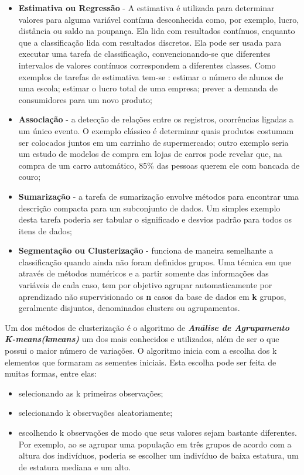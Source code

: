 \documentclass[a4paper, 12pt]{article}\usepackage[]{graphicx}\usepackage[]{color}
\begin{document}
\begin{multicols}{2}
\begin{itemize}
			\item \textbf{Estimativa ou Regressão} - A estimativa é utilizada para determinar  valores para alguma variável contínua desconhecida como, por exemplo, lucro, distância ou saldo na poupança. Ela lida com resultados contínuos, enquanto que a classificação lida com resultados discretos. Ela pode ser usada para executar uma tarefa de classificação, convencionando-se que diferentes intervalos de valores contínuos correspondem a diferentes classes. Como exemplos de tarefas de estimativa tem-se : estimar o número de alunos de uma escola; estimar o lucro  total de uma empresa;  prever a demanda de consumidores para um novo produto;
			
			\item \textbf{Associação} - a detecção de relações entre os registros, ocorrências ligadas a um único evento. O exemplo clássico é determinar quais produtos costumam ser colocados juntos em um carrinho de supermercado; outro exemplo seria um estudo de modelos de compra em lojas de carros pode revelar que, na compra de um carro automático, 85\% das pessoas querem ele com bancada de couro;
			
			\item \textbf{Sumarização} - a tarefa de sumarização envolve métodos para encontrar uma descrição compacta para um subconjunto de dados. Um simples exemplo desta tarefa poderia ser tabular o significado e desvios padrão para todos os itens de dados;
			
			\item \textbf{Segmentação ou Clusterização} - funciona de maneira semelhante a classificação quando ainda não foram definidos grupos. Uma técnica em que através de métodos numéricos e a partir somente das informações das variáveis de cada caso, tem por objetivo agrupar automaticamente por aprendizado não supervisionado os \textbf{n} casos da base de dados em \textbf{k} grupos, geralmente disjuntos, denominados clusters ou agrupamentos.			
		\end{itemize}
	
		Um dos métodos de clusterização é o algoritmo de \textit{\textbf{Análise de Agrupamento K-means(kmeans)}}  um dos mais conhecidos e utilizados, além de ser o que possui o maior número de variações. O algoritmo inicia com a escolha dos  k elementos que formaram as sementes iniciais. Esta escolha pode ser feita de muitas formas, entre elas:
		\begin{itemize}
			\item selecionando as k primeiras observações;
			\item selecionando k observações aleatoriamente; 
			\item escolhendo k observações de modo que seus valores sejam bastante diferentes. Por exemplo, ao se agrupar uma população em três grupos de acordo com a altura dos indivíduos, poderia se escolher um indivíduo de baixa estatura, um de estatura mediana e um alto.			
		\end{itemize}
	

\end{multicols}
\end{document}
